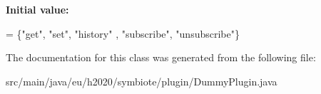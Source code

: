 {\bfseries Initial value\+:}
\begin{DoxyCode}
= \{\textcolor{stringliteral}{"get"}, 
                                                           \textcolor{stringliteral}{"set"}, 
                                                           \textcolor{stringliteral}{"history"} ,
                                                           \textcolor{stringliteral}{"subscribe"},
                                                           \textcolor{stringliteral}{"unsubscribe"}\}
\end{DoxyCode}


The documentation for this class was generated from the following file\+:\begin{DoxyCompactItemize}
\item 
src/main/java/eu/h2020/symbiote/plugin/Dummy\+Plugin.\+java\end{DoxyCompactItemize}
